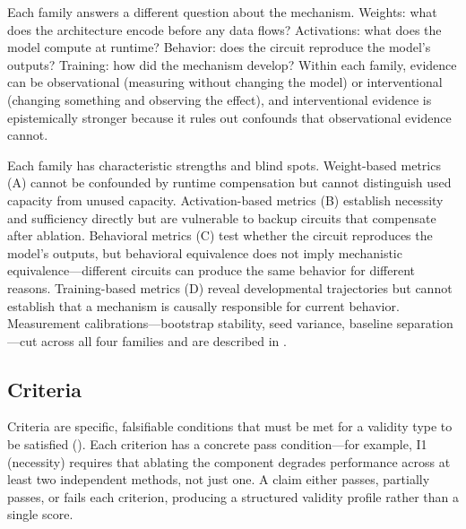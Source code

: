 \documentclass{article}
\begin{document}
Each family answers a different question about the mechanism. Weights: what does the architecture encode before any data flows? Activations: what does the model compute at runtime? Behavior: does the circuit reproduce the model's outputs? Training: how did the mechanism develop? Within each family, evidence can be observational (measuring without changing the model) or interventional (changing something and observing the effect), and interventional evidence is epistemically stronger because it rules out confounds that observational evidence cannot.

Each family has characteristic strengths and blind spots. Weight-based metrics (A) cannot be confounded by runtime compensation but cannot distinguish used capacity from unused capacity. Activation-based metrics (B) establish necessity and sufficiency directly but are vulnerable to backup circuits that compensate after ablation. Behavioral metrics (C) test whether the circuit reproduces the model's outputs, but behavioral equivalence does not imply mechanistic equivalence---different circuits can produce the same behavior for different reasons. Training-based metrics (D) reveal developmental trajectories but cannot establish that a mechanism is causally responsible for current behavior. Measurement calibrations---bootstrap stability, seed variance, baseline separation---cut across all four families and are described in .

\subsection{Criteria}
\label{sec:criteria}

Criteria are specific, falsifiable conditions that must be met for a validity type to be satisfied (). Each criterion has a concrete pass condition---for example, I1 (necessity) requires that ablating the component degrades performance across at least two independent methods, not just one. A claim either passes, partially passes, or fails each criterion, producing a structured validity profile rather than a single score.
\end{document}
